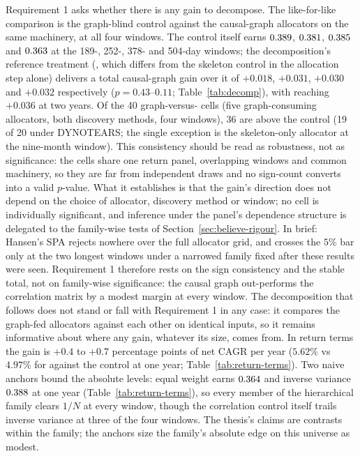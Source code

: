 Requirement 1 asks whether there is any gain to decompose. The like-for-like
comparison is the graph-blind \HRP{} control against the causal-graph
allocators on the same machinery, at all four windows. The control itself
earns $0.389$, $0.381$, $0.385$ and
$0.363$ at the 189-, 252-, 378- and 504-day windows; the
decomposition's reference treatment (\skelsem{}, which differs from the
skeleton control in the allocation step alone) delivers a total
causal-graph gain over it of $+0.018$,
$+0.031$, $+0.030$ and $+0.032$ respectively ($p=0.43$--$0.11$;
Table~\ref{tab:decomp}), with \orientsem{} reaching $+0.036$ at two
years. Of the 40
graph-versus-\HRP{} cells (five graph-consuming allocators, both
discovery methods, four windows), 36 are above the control (19 of 20 under
DYNOTEARS; the single exception is the skeleton-only allocator at the
nine-month window). This consistency should be read as robustness, not as
significance: the cells share one return panel, overlapping windows and
common machinery, so they are far from independent draws and no sign-count
converts into a valid $p$-value. What it establishes is that the gain's
direction does not depend on the choice of allocator, discovery method or
window; no cell is individually significant, and inference under the
panel's dependence structure is delegated to the family-wise tests of
Section~\ref{sec:believe-rigour}. In brief: Hansen's SPA rejects
nowhere over the full allocator grid, and crosses the $5\%$ bar only at
the two longest windows under a narrowed family fixed after these
results were seen. Requirement 1 therefore rests on the sign
consistency and the stable total, not on family-wise significance: the
causal graph out-performs the correlation matrix by a modest margin at
every window. The decomposition that follows
does not stand or fall with Requirement 1 in any case: it compares the
graph-fed allocators against each other on identical inputs, so it
remains informative about where any gain, whatever its size, comes
from. In return
terms the gain is $+0.4$ to $+0.7$ percentage points of net CAGR per year
($5.62\%$ vs $4.97\%$ for \skelsem{} against the control at one year;
Table~\ref{tab:return-terms}). Two naive anchors bound the absolute
levels: equal weight earns $0.364$ and inverse variance
$0.388$ at one year (Table~\ref{tab:return-terms}), so every
member of the hierarchical family clears $1/N$ at every window, though
the correlation control itself trails inverse variance at three of the
four windows. The
thesis's claims are contrasts within the family; the anchors size the
family's absolute edge on this universe as modest.

